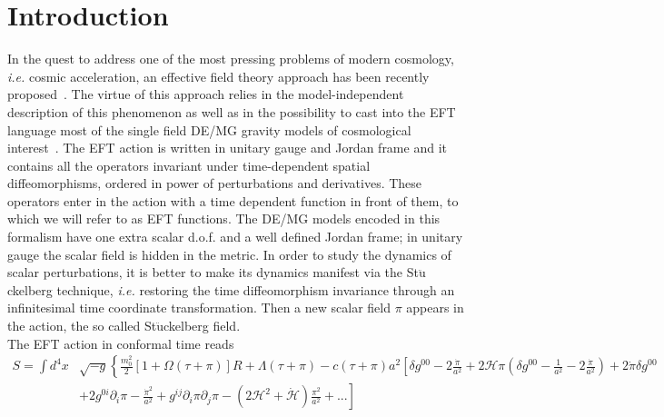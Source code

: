 \documentclass[prd,nofootinbib,showpacs]{revtex4}
\def\l{\left}
\def\r{\right}
\def\hub{{\mathcal H}}
\def\ie{{\frenchspacing\it i.e. }}
\begin{document}
{ 
\maketitle

\tableofcontents

\section{Introduction}\label{Sec:Intro}
%
In the quest to address one of the most pressing problems of modern cosmology, \ie cosmic acceleration, an effective field theory approach has been recently proposed~\cite{Gubitosi:2012hu,Bloomfield:2012ff}. The virtue of this approach relies in the  model-independent description of this phenomenon as well as in the possibility to cast into the EFT language most of the single field DE/MG gravity models of cosmological interest~\cite{Gubitosi:2012hu,Bloomfield:2012ff,Gleyzes:2013ooa,Bloomfield:2013efa}.  The EFT action is written in unitary gauge and Jordan frame and it contains all the operators invariant under time-dependent spatial diffeomorphisms, ordered in power of perturbations and derivatives. These operators enter in the action with a time dependent function in front of them,  to which we will refer to as EFT functions. The DE/MG models encoded in this formalism have one extra scalar d.o.f. and a well defined Jordan frame; in unitary gauge the scalar field is hidden in the metric. In order to study the 
dynamics of scalar perturbations, it is better to make its dynamics manifest via the St$\ddot{\text{u}}$ckelberg technique, \ie restoring  the time diffeomorphism invariance through an infinitesimal time coordinate transformation. Then a  new scalar field $\pi$ appears in the action, the so called St$\ddot{\text{u}}$ckelberg field. \\
The EFT action in conformal time reads
\begin{align}\label{full_action_Stuck}
S = \int d^4x& \sqrt{-g} \left \{ \frac{m_0^2}{2} \l[1+\Omega(\tau+\pi)\r]R+ \Lambda(\tau+\pi) - c(\tau+\pi)a^2\left[ \delta g^{00}-2\frac{\dot{\pi}}{a^2} + 2\hub\pi\left(\delta g^{00}-\frac{1}{a^2}-2\frac{\dot{\pi}}{a^2}\right) +2\dot{\pi}\delta g^{00} \right.\right. \nonumber \\
 &\left.\left.+2g^{0i}\partial_i\pi-\frac{\dot{\pi}^2}{a^2}+ g^{ij}\partial_i \pi \partial_j\pi -\l(2\hub^2+\dot{\hub}\r)\frac{\pi^2}{a^2} + ... \right] \right. \nonumber \\

\end{align}}
\end{document}
